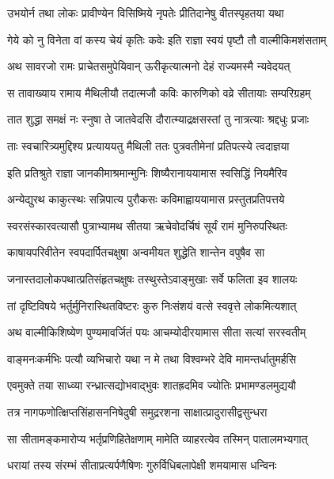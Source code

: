 \twolineshloka
{उभयोर्न तथा लोकः प्रावीण्येन विसिष्मिये}
{नृपतेः प्रीतिदानेषु वीतस्पृहतया यथा} %

\twolineshloka
{गेये को नु विनेता वां कस्य चेयं कृतिः कवेः}
{इति राज्ञा स्वयं पृष्टौ तौ वाल्मीकिमशंसताम्} %

\twolineshloka
{अथ सावरजो रामः प्राचेतसमुपेयिवान्}
{ऊरीकृत्यात्मनो देहं राज्यमस्मै न्यवेदयत्} %

\twolineshloka
{स तावाख्याय रामाय मैथिलीयौ तदात्मजौ}
{कविः कारुणिको वव्रे सीतायाः सम्परिग्रहम्} %

\twolineshloka
{तात शुद्धा समक्षं नः स्नुषा ते जातवेदसि}
{दौरात्म्याद्रक्षसस्तां तु नात्रत्याः श्रद्दधुः प्रजाः} %

\twolineshloka
{ताः स्वचारित्र्यमुद्दिश्य प्रत्याययतु मैथिली}
{ततः पुत्रवतीमेनां प्रतिपत्स्ये त्वदाज्ञया} %

\twolineshloka
{इति प्रतिश्रुते राज्ञा जानकीमाश्रमान्मुनिः}
{शिष्यैरानाययामास स्वसिद्धिं नियमैरिव} %

\twolineshloka
{अन्येद्युरथ काकुत्स्थः सन्निपात्य पुरौकसः}
{कविमाह्वाययामास प्रस्तुतप्रतिपत्तये} %

\twolineshloka
{स्वरसंस्कारवत्यासौ पुत्राभ्यामथ सीतया}
{ऋचेवोदर्चिषं सूर्यं रामं मुनिरुपस्थितः} %

\twolineshloka
{काषायपरिवीतेन स्वपदार्पितचक्षुषा}
{अन्वमीयत शुद्धेति शान्तेन वपुषैव सा} %

\twolineshloka
{जनास्तदालोकपथात्प्रतिसंहृतचक्षुषः}
{तस्थुस्तेऽवाङ्मुखाः सर्वे फलिता इव शालयः} %

\twolineshloka
{तां दृष्टिविषये भर्तुर्मुनिरास्थितविष्टरः}
{कुरु निःसंशयं वत्से स्ववृत्ते लोकमित्यशात्} %

\twolineshloka
{अथ वाल्मीकिशिष्येण पुण्यमावर्जितं पयः}
{आचम्योदीरयामास सीता सत्यां सरस्वतीम्} %

\twolineshloka
{वाङ्मनःकर्मभिः पत्यौ व्यभिचारो यथा न मे}
{तथा विश्वम्भरे देवि मामन्तर्धातुमर्हसि} %

\twolineshloka
{एवमुक्ते तया साध्व्या रन्ध्रात्सद्योभवाद्भुवः}
{शातह्रदमिव ज्योतिः प्रभामण्डलमुद्ययौ} %

\twolineshloka
{तत्र नागफणोत्क्षिप्तसिंहासननिषेदुषी}
{समुद्ररशना साक्षात्प्रादुरासीद्वसुन्धरा} %

\twolineshloka
{सा सीतामङ्कमारोप्य भर्तृप्रणिहितेक्षणाम्}
{मामेति व्याहरत्येव तस्मिन् पातालमभ्यगात्} %

\twolineshloka
{धरायां तस्य संरम्भं सीताप्रत्यर्पणैषिणः}
{गुरुर्विधिबलापेक्षी शमयामास धन्विनः} %

